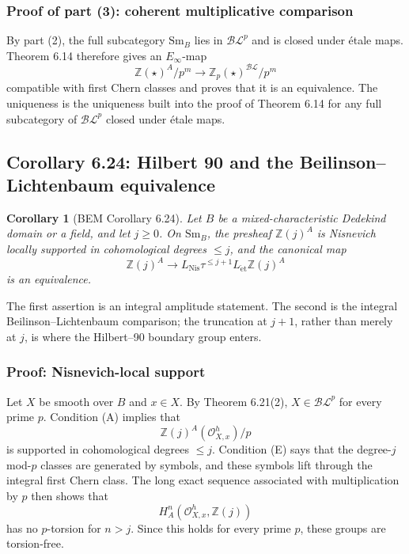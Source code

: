 \documentclass[11pt,a4paper]{article}
\newcommand{\Z}{\mathbb Z}
\newcommand{\Sm}{\mathrm{Sm}}
\newcommand{\Nis}{\mathrm{Nis}}
\newcommand{\et}{\mathrm{\acute et}}
\newcommand{\BL}{\mathcal{BL}}
\newcommand{\BLp}{\mathcal{BL}^{p}}
\newcommand{\1}{\mathbf 1}
\newcommand{\calO}{\mathcal O}
\theoremstyle{bemstyle}
\newtheorem{corollary}[theorem]{Corollary}
\theoremstyle{definition}
\begin{document}
\subsubsection{Proof of part (3): coherent multiplicative comparison}

By part (2), the full subcategory \(\Sm_B\) lies in \(\BLp\) and is closed under \'etale maps. Theorem 6.14 therefore gives an \(E_\infty\)-map
\[
       \Z(\star)^A/p^m\longrightarrow \Z_p(\star)^{\BL}/p^m
\]
compatible with first Chern classes and proves that it is an equivalence. The uniqueness is the uniqueness built into the proof of Theorem 6.14 for any full subcategory of \(\BLp\) closed under \'etale maps.

\subsection{Corollary 6.24: Hilbert 90 and the Beilinson--Lichtenbaum equivalence}

\begin{corollary}[BEM Corollary 6.24]
Let \(B\) be a mixed-characteristic Dedekind domain or a field, and let \(j\geq0\). On \(\Sm_B\), the presheaf \(\Z(j)^A\) is Nisnevich locally supported in cohomological degrees \(\leq j\), and the canonical map
\[
       \Z(j)^A\longrightarrow L_{\Nis}\tau^{\leq j+1}L_{\et}\Z(j)^A
\]
is an equivalence.
\end{corollary}

The first assertion is an integral amplitude statement. The second is the integral Beilinson--Lichtenbaum comparison; the truncation at \(j+1\), rather than merely at \(j\), is where the Hilbert--90 boundary group enters.

\subsubsection{Proof: Nisnevich-local support}

Let \(X\) be smooth over \(B\) and \(x\in X\). By Theorem 6.21(2), \(X\in\BLp\) for every prime \(p\). Condition (A) implies that
\[
       \Z(j)^A(\calO^h_{X,x})/p
\]
is supported in cohomological degrees \(\leq j\). Condition (E) says that the degree-\(j\) mod-\(p\) classes are generated by symbols, and these symbols lift through the integral first Chern class. The long exact sequence associated with multiplication by \(p\) then shows that
\[
       H_A^n(\calO^h_{X,x},\Z(j))
\]
has no \(p\)-torsion for \(n>j\). Since this holds for every prime \(p\), these groups are torsion-free.
\end{document}
